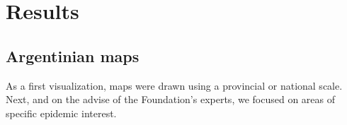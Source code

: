 \section{Results}

\subsection{Argentinian maps}
As a first visualization, maps were drawn using a provincial or national scale.
Next, and on the advise of the Foundation's experts, we focused on areas of specific epidemic interest.
